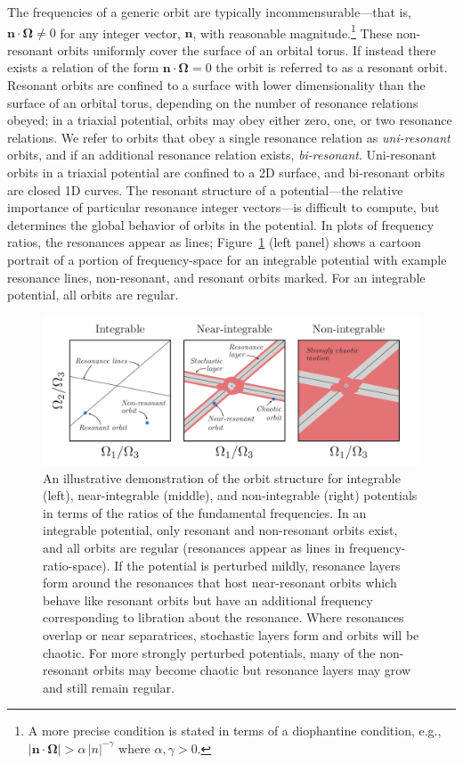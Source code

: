 \documentclass[letterpaper,12pt,preprint]{aastex}
\newcommand{\bs}[1]{\boldsymbol{#1}}
\begin{document}
The frequencies of a generic orbit are typically incommensurable---that is, $\bs{n} \cdot \bs{\Omega} \neq 0$ for any integer vector, $\bs{n}$, with reasonable magnitude.\footnote{A more precise condition is stated in terms of a diophantine condition, e.g., $|\bs{n} \cdot \boldsymbol{\Omega}| > \alpha \, |n|^{-\gamma}$ where $\alpha, \gamma>0$.} These non-resonant orbits uniformly cover the surface of an orbital torus. If instead there exists a relation of the form $\boldsymbol{n} \cdot \boldsymbol{\Omega} = 0$ the orbit is referred to as a resonant orbit. Resonant orbits are confined to a surface with lower dimensionality than the surface of an orbital torus, depending on the number of resonance relations obeyed; in a triaxial potential, orbits may obey either zero, one, or two resonance relations. We refer to orbits that obey a single resonance relation as \emph{uni-resonant} orbits, and if an additional resonance relation exists, \emph{bi-resonant}. Uni-resonant orbits in a triaxial potential are confined to a 2D surface, and bi-resonant orbits are closed 1D curves. The resonant structure of a potential---the relative importance of particular resonance integer vectors---is difficult to compute, but determines the global behavior of orbits in the potential. In plots of frequency ratios, the resonances appear as lines; Figure~\ref{fig:cartoons} (left panel) shows a cartoon portrait of a portion of frequency-space for an integrable potential with example resonance lines, non-resonant, and resonant orbits marked. For an integrable potential, all orbits are regular.

\begin{figure}[h]
\begin{center}
\includegraphics[width=\textwidth]{figures/cartoons.pdf}
\caption{An illustrative demonstration of the orbit structure for integrable (left), near-integrable (middle), and non-integrable (right) potentials in terms of the ratios of the fundamental frequencies. In an integrable potential, only resonant and non-resonant orbits exist, and all orbits are regular (resonances appear as lines in frequency-ratio-space). If the potential is perturbed mildly, resonance layers form around the resonances that host near-resonant orbits which behave like resonant orbits but have an additional frequency corresponding to libration about the resonance. Where resonances overlap or near separatrices, stochastic layers form and orbits will be chaotic. For more strongly perturbed potentials, many of the non-resonant orbits may become chaotic but resonance layers may grow and still remain regular. }
\label{fig:cartoons}
\end{center}
\end{figure}
\end{document}
